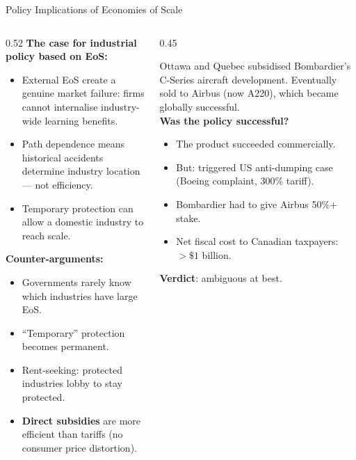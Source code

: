 \documentclass[aspectratio=169]{beamer}
\begin{document}
\begin{frame}{Policy Implications of Economies of Scale}
\begin{columns}
\begin{column}{0.52\textwidth}
\textbf{The case for industrial policy based on EoS:}
\begin{itemize}
  \item External EoS create a genuine market failure: firms cannot internalise industry-wide learning benefits.
  \item Path dependence means historical accidents determine industry location --- not efficiency.
  \item Temporary protection can allow a domestic industry to reach scale.
\end{itemize}
\vspace{0.3em}
\textbf{Counter-arguments:}
\begin{itemize}
  \item Governments rarely know which industries have large EoS.
  \item ``Temporary'' protection becomes permanent.
  \item Rent-seeking: protected industries lobby to stay protected.
  \item \textbf{Direct subsidies} are more efficient than tariffs (no consumer price distortion).
\end{itemize}
\end{column}
\begin{column}{0.45\textwidth}
\begin{canadex}
  Ottawa and Quebec subsidised Bombardier's C-Series aircraft development. Eventually sold to Airbus (now A220), which became globally successful.\\[0.3em]
  \textbf{Was the policy successful?}
  \begin{itemize}\small
    \item The product succeeded commercially.
    \item But: triggered US anti-dumping case (Boeing complaint, 300\% tariff).
    \item Bombardier had to give Airbus 50\%+ stake.
    \item Net fiscal cost to Canadian taxpayers: $>\$1$ billion.
  \end{itemize}
  \textbf{Verdict}: ambiguous at best.
\end{canadex}
\end{column}
\end{columns}
\end{frame}
\end{document}
